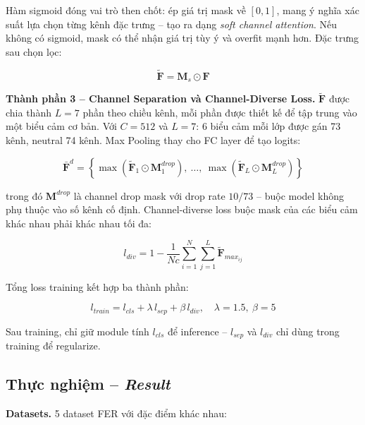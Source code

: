\documentclass[12pt,a4paper]{article}
\let\oldtextbf\textbf
\renewcommand{\textbf}[1]{\oldtextbf{\textcolor{hcmublue}{#1}}}
\begin{document}
Hàm sigmoid đóng vai trò then chốt: ép giá trị mask về $[0, 1]$, mang ý nghĩa xác suất lựa chọn từng kênh đặc trưng -- tạo ra dạng \textit{soft channel attention}. Nếu không có sigmoid, mask có thể nhận giá trị tùy ý và overfit mạnh hơn. Đặc trưng sau chọn lọc:

\begin{equation}
    \tilde{\mathbf{F}} = \mathbf{M}_s \odot \mathbf{F}
    \label{eq:masked_feature}
\end{equation}

\textbf{Thành phần 3 -- Channel Separation và Channel-Diverse Loss.}
$\tilde{\mathbf{F}}$ được chia thành $L=7$ phần theo chiều kênh, mỗi phần được thiết kế để tập trung vào một biểu cảm cơ bản. Với $C=512$ và $L=7$: 6 biểu cảm mỗi lớp được gán 73 kênh, neutral 74 kênh. Max Pooling thay cho FC layer để tạo logits:

\begin{equation}
    \bar{\mathbf{F}}^d = \left\{\max(\tilde{\mathbf{F}}_1 \odot \mathbf{M}^{drop}_1),\ \ldots,\ \max(\tilde{\mathbf{F}}_L \odot \mathbf{M}^{drop}_L)\right\}
    \label{eq:channel_sep}
\end{equation}

trong đó $\mathbf{M}^{drop}$ là channel drop mask với drop rate $10/73$ -- buộc model không phụ thuộc vào số kênh cố định. Channel-diverse loss buộc mask của các biểu cảm khác nhau phải khác nhau tối đa:

\begin{equation}
    l_{div} = 1 - \frac{1}{Nc} \sum_{i=1}^{N} \sum_{j=1}^{L} \tilde{\mathbf{F}}_{max_{ij}}
    \label{eq:div_loss}
\end{equation}

Tổng loss training kết hợp ba thành phần:

\begin{equation}
    l_{train} = l_{cls} + \lambda\, l_{sep} + \beta\, l_{div}, \quad \lambda=1.5,\ \beta=5
    \label{eq:total_loss}
\end{equation}

Sau training, chỉ giữ module tính $l_{cls}$ để inference -- $l_{sep}$ và $l_{div}$ chỉ dùng trong training để regularize.

\subsection{Thực nghiệm -- \textit{Result}}

\textbf{Datasets.} 5 dataset FER với đặc điểm khác nhau:
\end{document}
